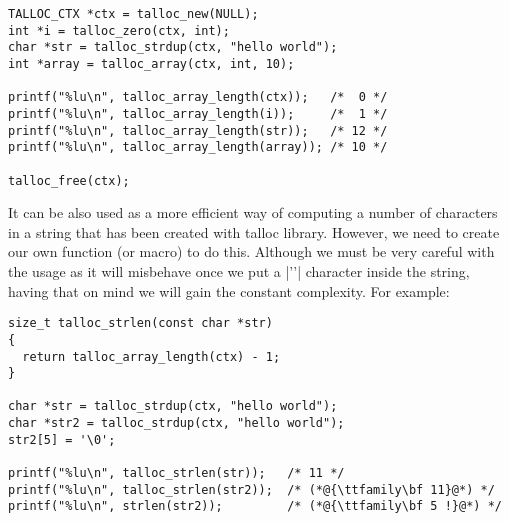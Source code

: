 \begin{lstlisting}[caption={Length of an array},label=lst:array-length]
TALLOC_CTX *ctx = talloc_new(NULL);
int *i = talloc_zero(ctx, int);
char *str = talloc_strdup(ctx, "hello world");
int *array = talloc_array(ctx, int, 10);

printf("%lu\n", talloc_array_length(ctx));   /*  0 */
printf("%lu\n", talloc_array_length(i));     /*  1 */
printf("%lu\n", talloc_array_length(str));   /* 12 */
printf("%lu\n", talloc_array_length(array)); /* 10 */

talloc_free(ctx);
\end{lstlisting}

It can be also used as a more efficient way of computing a number of characters
in a string that has been created with talloc library. However, we need to
create our own function (or macro) to do this. Although we must be very careful
with the usage as it will misbehave once we put a |'\0'| character inside the
string, having that on mind we will gain the constant complexity. For example:

\begin{lstlisting}[caption={Length of a string},label=lst:array-length]
size_t talloc_strlen(const char *str)
{
  return talloc_array_length(ctx) - 1;
}

char *str = talloc_strdup(ctx, "hello world");
char *str2 = talloc_strdup(ctx, "hello world");
str2[5] = '\0';

printf("%lu\n", talloc_strlen(str));   /* 11 */
printf("%lu\n", talloc_strlen(str2));  /* (*@{\ttfamily\bf 11}@*) */
printf("%lu\n", strlen(str2));         /* (*@{\ttfamily\bf 5 !}@*) */
\end{lstlisting}